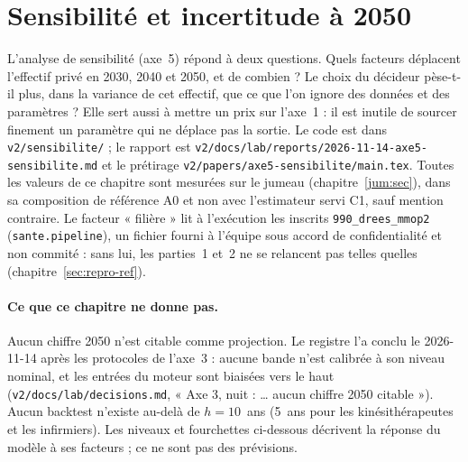 \begingroup\sloppy\setlength{\emergencystretch}{3em}%

\section{Sensibilité et incertitude à 2050}\label{sec:sensibilite-ref}\label{sen:sec}

L'analyse de sensibilité (axe~5) répond à deux questions. Quels facteurs déplacent l'effectif privé en 2030, 2040
et 2050, et de combien ? Le choix du décideur pèse-t-il plus, dans la variance de cet effectif, que ce que l'on
ignore des données et des paramètres ? Elle sert aussi à mettre un prix sur l'axe~1 : il est inutile de sourcer
finement un paramètre qui ne déplace pas la sortie. Le code est dans \texttt{v2/sensibilite/} ; le rapport est
\texttt{v2/docs/lab/reports/2026-11-14-axe5-sensibilite.md} et le prétirage \texttt{v2/papers/axe5-sensibilite/main.tex}.
Toutes les valeurs de ce chapitre sont mesurées sur le jumeau (chapitre~\ref{jum:sec}), dans sa composition de
référence A0 et non avec l'estimateur servi C1, sauf mention contraire. Le facteur « filière » lit à l'exécution
les inscrits \texttt{990\_drees\_mmop2} (\texttt{sante.pipeline}), un fichier fourni à l'équipe sous accord de
confidentialité et non commité : sans lui, les parties~1 et~2 ne se relancent pas telles quelles
(chapitre~\ref{sec:repro-ref}).

\paragraph{Ce que ce chapitre ne donne pas.} Aucun chiffre 2050 n'est citable comme projection. Le registre l'a
conclu le 2026-11-14 après les protocoles de l'axe~3 : aucune bande n'est calibrée à son niveau nominal, et les
entrées du moteur sont biaisées vers le haut (\texttt{v2/docs/lab/decisions.md}, « Axe 3, nuit : \dots{} aucun
chiffre 2050 citable »). Aucun backtest n'existe au-delà de $h = 10$\mesure{}~ans (5\mesure{}~ans pour les
kinésithérapeutes et les infirmiers). Les niveaux et fourchettes ci-dessous décrivent la réponse du modèle à ses
facteurs ; ce ne sont pas des prévisions.

